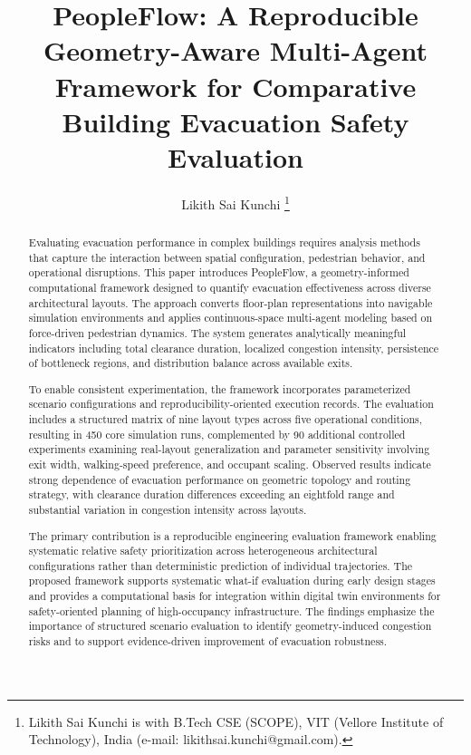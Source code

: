 \documentclass[journal]{IEEEtran}
\begin{document}
\title{PeopleFlow: A Reproducible Geometry-Aware Multi-Agent Framework for Comparative Building Evacuation Safety Evaluation}

\author{Likith Sai Kunchi%
\thanks{Likith Sai Kunchi is with B.Tech CSE (SCOPE), VIT (Vellore Institute of Technology), India (e-mail: likithsai.kunchi@gmail.com).}}

\maketitle

\begin{abstract}
Evaluating evacuation performance in complex buildings requires analysis methods that capture the interaction between spatial configuration, pedestrian behavior, and operational disruptions. This paper introduces PeopleFlow, a geometry-informed computational framework designed to quantify evacuation effectiveness across diverse architectural layouts. The approach converts floor-plan representations into navigable simulation environments and applies continuous-space multi-agent modeling based on force-driven pedestrian dynamics. The system generates analytically meaningful indicators including total clearance duration, localized congestion intensity, persistence of bottleneck regions, and distribution balance across available exits.

To enable consistent experimentation, the framework incorporates parameterized scenario configurations and reproducibility-oriented execution records. The evaluation includes a structured matrix of nine layout types across five operational conditions, resulting in 450 core simulation runs, complemented by 90 additional controlled experiments examining real-layout generalization and parameter sensitivity involving exit width, walking-speed preference, and occupant scaling. Observed results indicate strong dependence of evacuation performance on geometric topology and routing strategy, with clearance duration differences exceeding an eightfold range and substantial variation in congestion intensity across layouts.

The primary contribution is a reproducible engineering evaluation framework enabling systematic relative safety prioritization across heterogeneous architectural configurations rather than deterministic prediction of individual trajectories. The proposed framework supports systematic what-if evaluation during early design stages and provides a computational basis for integration within digital twin environments for safety-oriented planning of high-occupancy infrastructure. The findings emphasize the importance of structured scenario evaluation to identify geometry-induced congestion risks and to support evidence-driven improvement of evacuation robustness.
\end{abstract}
\end{document}
